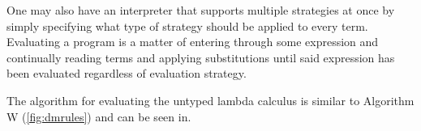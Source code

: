 \documentclass[11pt,oneside,a4paper]{report}
\begin{document}
One may also have an interpreter that supports multiple strategies at once by simply specifying what type of strategy should be applied to every term.
Evaluating a program is a matter of entering through some expression and continually reading terms and applying substitutions until said expression has been evaluated regardless of evaluation strategy. 

The algorithm for evaluating the untyped lambda calculus is similar to Algorithm W (\autoref{fig:dmrules}) and can be seen in.
\begin{figure}[ht]
    \begin{mdframed}[style=style1]
        \vspace*{0.4cm}
        \begin{subfigure}[b]{0.30\textwidth}
            \begin{prooftree}
            \end{prooftree}   
            \label{eq:prooftree:terminal}
            \caption{}
        \end{subfigure}
        \begin{subfigure}[b]{0.69\textwidth}
            \begin{prooftree}
            \end{prooftree}   
            \label{eq:prooftree:ref}
            \caption{}
        \end{subfigure}
        \begin{subfigure}[b]{1\textwidth}
            \begin{prooftree}
            \end{prooftree}   
            \label{eq:prooftree:ref}
            \caption{}
        \end{subfigure}

    \end{mdframed}
    
\end{figure}
\end{document}
